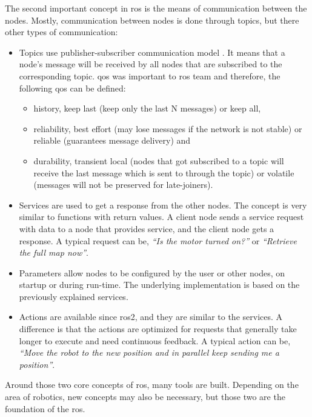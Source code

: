 The second important concept in \ac{ros} is the means of communication between the nodes. Mostly, communication between nodes is done through topics, but there other types of communication:
\begin{itemize}
    \item Topics use publisher-subscriber communication model \cite{chen_beaconvey_2018}. It means that a node's message will be received by all nodes that are subscribed to the corresponding topic. \ac{qos} was important to \ac{ros} team and therefore, the following \ac{qos} can be defined:
    \begin{itemize}
        \item history, keep last (keep only the last N messages) or keep all,
        \item reliability, best effort (may lose messages if the network is not stable) or reliable (guarantees message delivery) and
        \item durability, transient local (nodes that got subscribed to a topic will receive the last message which is sent to through the topic) or volatile (messages will not be preserved for late-joiners).
    \end{itemize}
    \item Services are used to get a response from the other nodes. The concept is very similar to functions with return values. A client node sends a service request with data to a node that provides service, and the client node gets a response. A typical request can be, \textit{``Is the motor turned on?''} or \textit{``Retrieve the full map now''}.
    \item Parameters allow nodes to be configured by the user or other nodes, on startup or during run-time. The underlying implementation is based on the previously explained services.
    \item Actions are available since \ac{ros2}, and they are similar to the services. A difference is that the actions are optimized for requests that generally take longer to execute and need continuous feedback. A typical action can be, \textit{``Move the robot to the new position and in parallel keep sending me a position''}.
\end{itemize}

Around those two core concepts of \ac{ros}, many tools are built. Depending on the area of robotics, new concepts may also be necessary, but those two are the foundation of the \ac{ros}.



